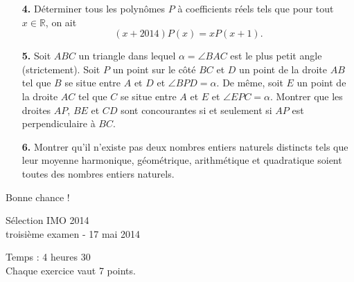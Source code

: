\documentclass[12pt,a4paper]{article}
\theoremstyle{plain}
\theoremstyle{definition}
\begin{document}
\begin{enumerate}

\item[\textbf{4.}] Déterminer tous les polynômes $P$ à coefficients réels tels que pour tout $x \in\mathbb{R}$, on ait
\[(x+2014)P(x)=xP(x+1).\]
\bigskip
\bigskip
\item[\textbf{5.}] Soit $ABC$ un triangle dans lequel $\alpha=\angle BAC$ est le plus petit angle (strictement). Soit $P$ un point sur le côté $BC$ et $D$ un point de la droite $AB$ tel que $B$ se situe entre $A$ et $D$ et $\angle BPD=\alpha$. De même, soit $E$ un point de la droite $AC$ tel que $C$ se situe entre $A$ et $E$ et $\angle EPC=\alpha$. Montrer que les droites $AP$, $BE$ et $CD$ sont concourantes si et seulement si $AP$ est perpendiculaire à $BC$.

\bigskip
\bigskip

\item[\textbf{6.}] Montrer qu'il n'existe pas deux nombres entiers naturels distincts tels que leur moyenne harmonique, géométrique, arithmétique et quadratique soient toutes des nombres entiers naturels.


 
\end{enumerate}

\vspace{15mm}
\begin{center}
Bonne chance !
\end{center}

\pagebreak


\begin{center}
{\huge Sélection IMO 2014} \\
\medskip troisième examen - 17 mai 2014
\end{center}
\vspace{8mm}
Temps : 4 heures 30\\
Chaque exercice vaut 7 points.

\vspace{15mm}
\end{document}
